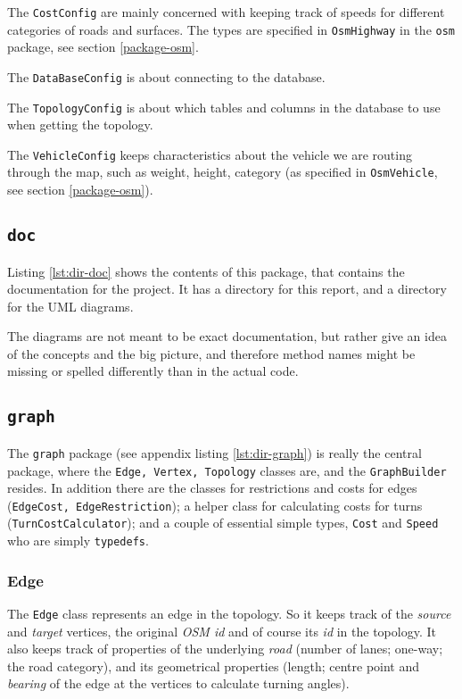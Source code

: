 \documentclass[../main.tex]{subfiles}
\begin{document}
The \texttt{CostConfig} are mainly concerned with keeping track of speeds for different categories of roads and surfaces. The types are specified in \texttt{OsmHighway} in the \texttt{osm} package, see section \ref{package-osm}.

The \texttt{DataBaseConfig} is about connecting to the database.

The \texttt{TopologyConfig} is about which tables and columns in the database to use when getting the topology.

The \texttt{VehicleConfig} keeps characteristics about the vehicle we are routing through the map, such as weight, height, category (as specified in \texttt{OsmVehicle}, see section \ref{package-osm}).

\subsection{\texttt{doc}}
Listing \ref{lst:dir-doc} shows the contents of this package, that contains the documentation for the project. It has a directory for this report, and a directory for the UML diagrams.

The diagrams are not meant to be exact documentation, but rather give an idea of the concepts and the big picture, and therefore method names might be missing or spelled differently than in the actual code.

\subsection{\texttt{graph}}
The \texttt{graph} package (see appendix listing \ref{lst:dir-graph}) is really the central package, where the \texttt{Edge, Vertex, Topology} classes are, and the \texttt{GraphBuilder} resides. In addition there are the classes for restrictions and costs for edges (\texttt{EdgeCost, EdgeRestriction}); a helper class for calculating costs for turns (\texttt{TurnCostCalculator}); and a couple of essential simple types, \texttt{Cost} and \texttt{Speed} who are simply \texttt{typedefs}.

\subsubsection{Edge}
The \texttt{Edge} class represents an edge in the topology. So it keeps track of the \textit{source} and \textit{target} vertices, the original \textit{OSM id} and of course its \textit{id} in the topology. It also keeps track of properties of the underlying \textit{road} (number of lanes; one-way; the road category), and its geometrical properties (length; centre point and \textit{bearing} of the edge at the vertices to calculate turning angles).
\end{document}
